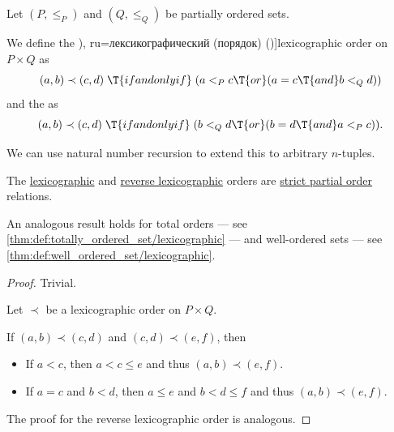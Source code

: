 \begin{definition}\label{def:lexicographic_order}\mimprovised
  Let \( (P, \leq_P) \) and \( (Q, \leq_Q) \) be partially ordered sets.

  We define the \term[en=lexicographic order (\cite[18]{DaveyPriestley2002LatticeTheory}), ru=лексикографический (порядок) (\cite[99]{Гуров2013ТеорияРешёток})]{lexicographic order} on \( P \times Q \) as
  \begin{equation}\label{eq:def:lexicographic_order}
    (a, b) \prec (c, d) \thickspace \T{if and only if} \thickspace (a <_P c \T{or} (a = c \T{and} b <_Q d))
  \end{equation}
  and the  as
  \begin{equation}\label{eq:def:lexicographic_order/reverse}
    (a, b) \prec (c, d) \thickspace \T{if and only if} \thickspace (b <_Q d \T{or} (b = d \T{and} a <_P c)).
  \end{equation}
\end{definition}
\begin{comments}
  \item We can use natural number recursion to extend this to arbitrary \( n \)-tuples.
\end{comments}

\begin{proposition}\label{thm:lexicographic_order_is_partial_order}
  The \hyperref[eq:def:lexicographic_order]{lexicographic} and \hyperref[eq:def:lexicographic_order/reverse]{reverse lexicographic} orders are \hyperref[def:partially_ordered_set]{strict partial order} relations.
\end{proposition}
\begin{comments}
  \item An analogous result holds for total orders --- see \cref{thm:def:totally_ordered_set/lexicographic} --- and well-ordered sets --- see \cref{thm:def:well_ordered_set/lexicographic}.
\end{comments}
\begin{proof}
   Trivial.

   Let \( \prec \) be a lexicographic order on \( P \times Q \).

  If \( (a, b) \prec (c, d) \) and \( (c, d) \prec (e, f) \), then
  \begin{itemize}
    \item If \( a < c \), then \( a < c \leq e \) and thus \( (a, b) \prec (e, f) \).

    \item If \( a = c \) and \( b < d \), then \( a \leq e \) and \( b < d \leq f \) and thus \( (a, b) \prec (e, f) \).
  \end{itemize}

   The proof for the reverse lexicographic order is analogous.
\end{proof}


